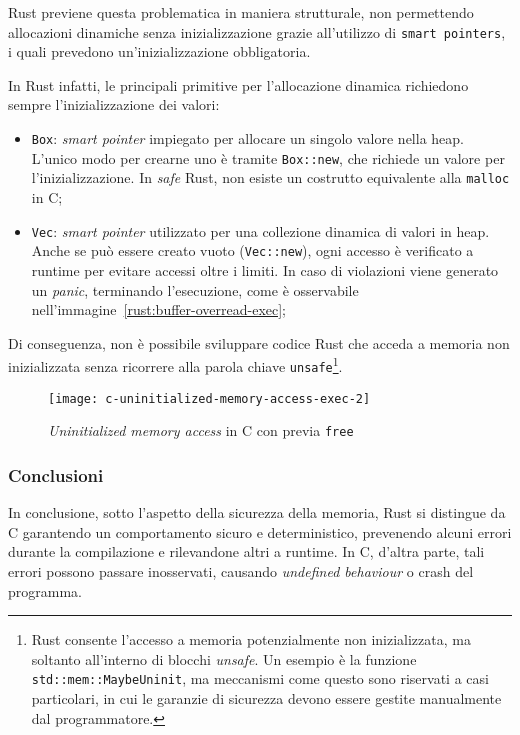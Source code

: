 \noindent Rust previene questa problematica in maniera strutturale, non permettendo allocazioni dinamiche senza inizializzazione grazie all'utilizzo di \texttt{smart pointers}, i quali prevedono un'inizializzazione obbligatoria.

In Rust infatti, le principali primitive per l'allocazione dinamica richiedono sempre l'inizializzazione dei valori:
\begin{itemize}
    \item \texttt{Box}: \textit{smart pointer} impiegato per allocare un singolo valore nella heap. L'unico modo per crearne uno è tramite \texttt{Box::new}, che richiede un valore per l'inizializzazione. In \textit{safe} Rust, non esiste un costrutto equivalente alla \texttt{malloc} in C;\ 
    \item \texttt{Vec}: \textit{smart pointer} utilizzato per una collezione dinamica di valori in heap. Anche se può essere creato vuoto (\texttt{Vec::new}), ogni accesso è verificato a runtime per evitare accessi oltre i limiti. In caso di violazioni viene generato un \textit{panic}, terminando l'esecuzione, come è osservabile nell'immagine~\ref{rust:buffer-overread-exec};
\end{itemize}
Di conseguenza, non è possibile sviluppare codice Rust che acceda a memoria non inizializzata senza ricorrere alla parola chiave \texttt{unsafe}\footnote{Rust consente l'accesso a memoria potenzialmente non inizializzata, ma soltanto all'interno di blocchi \textit{unsafe}. Un esempio è la funzione \texttt{std::mem::MaybeUninit}, ma meccanismi come questo sono riservati a casi particolari, in cui le garanzie di sicurezza devono essere gestite manualmente dal programmatore.}.
\begin{figure}[htbp]
\begin{center}
    \texttt{[image: c-uninitialized-memory-access-exec-2]}
    \caption{\textit{Uninitialized memory access} in C con previa \texttt{free}}\label{c:uninitialized-memory-access-exec-2}
    \end{center}
\end{figure}

\subsubsection{Conclusioni}
In conclusione, sotto l'aspetto della sicurezza della memoria, Rust si distingue da C garantendo un comportamento sicuro e deterministico, prevenendo
alcuni errori durante la compilazione e rilevandone altri a runtime. In C, d'altra parte, tali errori possono passare inosservati, causando
\textit{undefined behaviour} o crash del programma.

